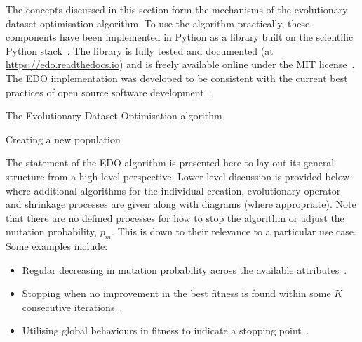 \documentclass[11pt]{article}
\newcommand{\balg}[1][htbp]{%
    \begin{algorithm}[#1]\DontPrintSemicolon
}
\newcommand{\ealg}{%
    \end{algorithm}
}
\begin{document}
The concepts discussed in this section form the mechanisms of the evolutionary
dataset optimisation algorithm. To use the algorithm practically, these
components have been implemented in Python as a library built on the scientific
Python stack~\cite{pandas,numpy}. The library is fully tested and documented (at
\url{https://edo.readthedocs.io}) and is freely available online under the MIT
license~\cite{edo-project}. The EDO implementation was developed to be
consistent with the current best practices of open source software
development~\cite{Jiminez2017}.

\balg%

\caption{The Evolutionary Dataset Optimisation algorithm}
\ealg\label{alg:edo}

\balg%

\caption{Creating a new population}
\ealg%

The statement of the EDO algorithm is presented here to lay out its general
structure from a high level perspective. Lower level discussion is provided
below where additional algorithms for the individual creation, evolutionary
operator and shrinkage processes are given along with diagrams (where
appropriate). Note that there are no defined processes for how to stop the
algorithm or adjust the mutation probability, \(p_m\). This is down to their
relevance to a particular use case. Some examples include:
\begin{itemize}
    \item Regular decreasing in mutation probability across the available
        attributes~\cite{Kuehn2013}.
    \item Stopping when no improvement in the best fitness is found within some
        \(K\) consecutive iterations~\cite{Leung2001}.
    \item Utilising global behaviours in fitness to indicate a stopping
        point~\cite{Marti2016}.
\end{itemize}
\end{document}
